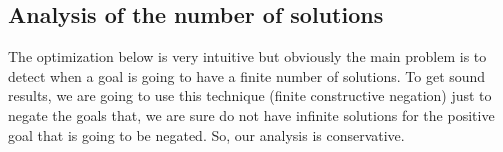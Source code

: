 \documentclass{tlp}
\newtheorem{definition}{Definition} %
\newcommand{\entails}{\models}
\newcommand{\vecy}{\overline{y}}
\begin{document}







\subsection{Analysis of the number of solutions}
\label{cneg:finite_analysis}

The optimization below is very intuitive but obviously the main
problem is to detect when a goal is going to have a finite number of
solutions. To get sound results, we are going to use this technique
(finite constructive negation) just to negate the goals that, we are
sure do not have infinite solutions for the positive goal that is going to be negated. So, our analysis is conservative.
\end{document}

